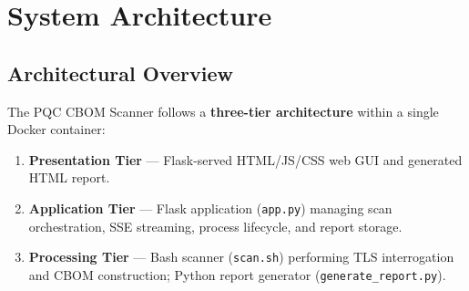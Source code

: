 \chapter{System Architecture}
\label{chap:architecture}

\section{Architectural Overview}
\label{sec:arch_overview}

The PQC CBOM Scanner follows a \textbf{three-tier architecture} within a single
Docker container:

\begin{enumerate}[noitemsep]
  \item \textbf{Presentation Tier} — Flask-served HTML/JS/CSS web GUI and
        generated HTML report.
  \item \textbf{Application Tier} — Flask application (\texttt{app.py}) managing
        scan orchestration, SSE streaming, process lifecycle, and report storage.
  \item \textbf{Processing Tier} — Bash scanner (\texttt{scan.sh}) performing
        TLS interrogation and CBOM construction; Python report generator
        (\texttt{generate\_report.py}).
\end{enumerate}

